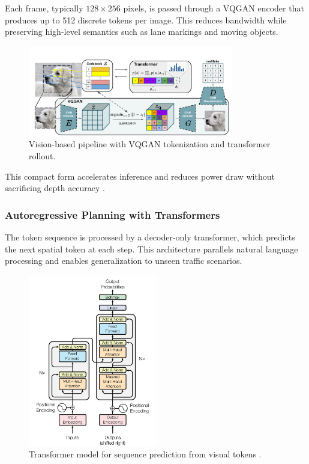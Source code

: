 \documentclass[12pt]{article}
\begin{document}
Each frame, typically $128 \times 256$ pixels, is passed through a VQGAN encoder
that produces up to 512 discrete tokens per image. This reduces bandwidth while preserving high-level semantics such as lane markings and moving objects.

\begin{figure}[H]
    \centering
    \includegraphics[width=0.8\textwidth]{architecture}
    \caption{Vision-based pipeline with VQGAN tokenization and transformer rollout\autocite{Esser2021TamingTransformersHighResolutionImage}.}
    \label{fig:tokenizer}
\end{figure}

This compact form accelerates inference and reduces power draw without sacrificing depth accuracy \autocite{Chen2024EndToEndAD}.

\subsubsection{Autoregressive Planning with Transformers}

The token sequence is processed by a decoder-only transformer, which predicts the next spatial token at each step. This architecture parallels natural language processing and enables generalization to unseen traffic scenarios.
\begin{figure}[H]
    \centering
    \includegraphics[width=0.5\textwidth]{architecture2}
    \caption{Transformer model for sequence prediction from visual tokens \autocite{vaswani2023attentionneed}.}
    \label{fig:transformer}
\end{figure}
\end{document}
